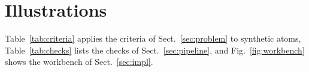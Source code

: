 
\section{Illustrations}\label{app:illustrations}
\suppressfloats[t]

Table~\ref{tab:criteria} applies the criteria of Sect.~\ref{sec:problem} to synthetic atoms,
Table~\ref{tab:checks} lists the checks of Sect.~\ref{sec:pipeline}, and Fig.~\ref{fig:workbench} shows the
workbench of Sect.~\ref{sec:impl}.



